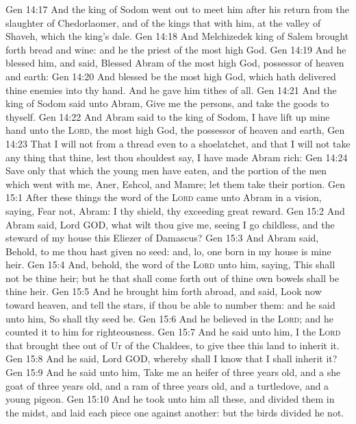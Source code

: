 \vs Gen 14:17 And the king of Sodom went out to meet him after his return from the slaughter of Chedorlaomer, and of the kings that  with him, at the valley of Shaveh, which  the king's dale.
\vs Gen 14:18 And Melchizedek king of Salem brought forth bread and wine: and he  the priest of the most high God.
\vs Gen 14:19 And he blessed him, and said, Blessed  Abram of the most high God, possessor of heaven and earth:
\vs Gen 14:20 And blessed be the most high God, which hath delivered thine enemies into thy hand. And he gave him tithes of all.
\vs Gen 14:21 And the king of Sodom said unto Abram, Give me the persons, and take the goods to thyself.
\vs Gen 14:22 And Abram said to the king of Sodom, I have lift up mine hand unto the \textsc{Lord}, the most high God, the possessor of heaven and earth,
\vs Gen 14:23 That I will not  from a thread even to a shoelatchet, and that I will not take any thing that  thine, lest thou shouldest say, I have made Abram rich:
\vs Gen 14:24 Save only that which the young men have eaten, and the portion of the men which went with me, Aner, Eshcol, and Mamre; let them take their portion.
\vs Gen 15:1 After these things the word of the \textsc{Lord} came unto Abram in a vision, saying, Fear not, Abram: I  thy shield,  thy exceeding great reward.
\vs Gen 15:2 And Abram said, Lord GOD, what wilt thou give me, seeing I go childless, and the steward of my house  this Eliezer of Damascus?
\vs Gen 15:3 And Abram said, Behold, to me thou hast given no seed: and, lo, one born in my house is mine heir.
\vs Gen 15:4 And, behold, the word of the \textsc{Lord}  unto him, saying, This shall not be thine heir; but he that shall come forth out of thine own bowels shall be thine heir.
\vs Gen 15:5 And he brought him forth abroad, and said, Look now toward heaven, and tell the stars, if thou be able to number them: and he said unto him, So shall thy seed be.
\vs Gen 15:6 And he believed in the \textsc{Lord}; and he counted it to him for righteousness.
\vs Gen 15:7 And he said unto him, I  the \textsc{Lord} that brought thee out of Ur of the Chaldees, to give thee this land to inherit it.
\vs Gen 15:8 And he said, Lord GOD, whereby shall I know that I shall inherit it?
\vs Gen 15:9 And he said unto him, Take me an heifer of three years old, and a she goat of three years old, and a ram of three years old, and a turtledove, and a young pigeon.
\vs Gen 15:10 And he took unto him all these, and divided them in the midst, and laid each piece one against another: but the birds divided he not.
